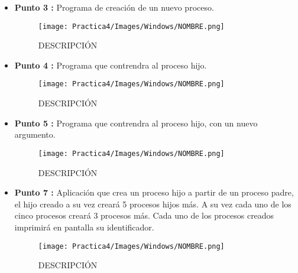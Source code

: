 \documentclass[12pt]{article}
\begin{document}
        \begin{itemize}
            \item[\Checkmark] \textbf{Punto 3 :}  
                Programa de creación de un nuevo proceso.   
                \begin{figure}[h!]
                    \centering
                    \texttt{[image: Practica4/Images/Windows/NOMBRE.png]}
                    \caption{DESCRIPCIÓN}
                \end{figure}


            \item[\Checkmark] \textbf{Punto 4 :}
                Programa que contrendra al proceso hijo.     
                \begin{figure}[h!]
                    \centering
                    \texttt{[image: Practica4/Images/Windows/NOMBRE.png]}
                    \caption{DESCRIPCIÓN}
                \end{figure}

                
            \item[\Checkmark] \textbf{Punto 5 :}
                Programa que contrendra al proceso hijo, con un nuevo argumento.
                
                \begin{figure}[h!]
                    \centering
                    \texttt{[image: Practica4/Images/Windows/NOMBRE.png]}
                    \caption{DESCRIPCIÓN}
                \end{figure}

            \item[\Checkmark] \textbf{Punto 7 :}
                Aplicación que crea un proceso hijo a partir de un proceso padre, el hijo creado a su vez creará 5 procesos hijos más. A su vez cada uno de los cinco procesos creará 3 procesos más. Cada uno de los procesos creados imprimirá en pantalla su identificador.

                \begin{figure}[h!]
                    \centering
                    \texttt{[image: Practica4/Images/Windows/NOMBRE.png]}
                    \caption{DESCRIPCIÓN}
                \end{figure}


\end{itemize}
\end{document}
